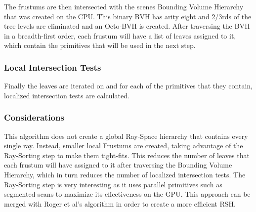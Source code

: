 The frustums are then intersected with the scenes Bounding Volume Hierarchy that was created on the CPU. This binary BVH has arity eight and 2/3rds of the tree levels are eliminated and an Octo-BVH is created. After traversing the BVH in a breadth-first order, each frustum will have a list of leaves assigned to it, which contain the primitives that will be used in the next step.

\subsubsection{Local Intersection Tests}

Finally the leaves are iterated on and for each of the primitives that they contain, localized intersection tests are calculated.

\subsubsection{Considerations}

This algorithm does not create a global Ray-Space hierarchy that contains every single ray. Instead, smaller local Frustums are created, taking advantage of the Ray-Sorting step to make them tight-fits. This reduces the number of leaves that each frustum will have assigned to it after traversing the Bounding Volume Hierarchy, which in turn reduces the number of localized intersection tests. The Ray-Sorting step is very interesting as it uses parallel primitives such as segmented scans to maximize its effectiveness on the GPU. This approach can be merged with Roger et al's \cite{Roger07} algorithm in order to create a more efficient RSH.